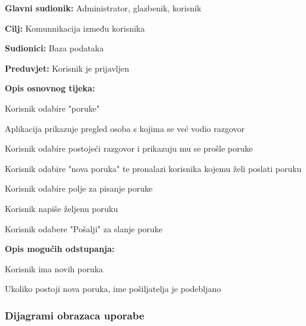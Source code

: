 				\noindent {}
				\begin{packed_item}

					\item \textbf{Glavni sudionik: }Administrator, glazbenik, korisnik
					\item  \textbf{Cilj:} Komunnikacija između korisnika
					\item  \textbf{Sudionici:} Baza podataka
					\item  \textbf{Preduvjet:} Korisnik je prijavljen
					\item  \textbf{Opis osnovnog tijeka:}
					
					\item[] \begin{packed_enum}

							\item Korisnik odabire "poruke"
							\item Aplikacija prikazuje pregled osoba s kojima se već vodio razgovor
							\item Korisnik odabire postojeći razgovor i prikazuju mu se prošle poruke
							\item Korisnik odabire "nova poruka" te pronalazi korisnika kojemu želi poslati poruku
							\item Korisnik odabire polje za pisanje poruke
							\item Korisnik napiše željenu poruku
							\item Korisnik odabere "Pošalji" za slanje poruke
					\end{packed_enum}
				
					\item  \textbf{Opis mogućih odstupanja:}
				
					\item[] \begin{packed_item}

						\item[2.a] Korisnik ima novih poruka
						\item[] \begin{packed_enum}
							\item Ukoliko postoji nova poruka, ime pošiljatelja je podebljano
						\end{packed_enum}
					\end{packed_item}
				\end{packed_item}
				
				
				\subsubsection{Dijagrami obrazaca uporabe}
				
